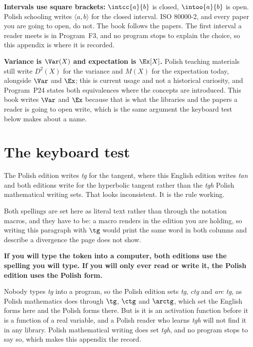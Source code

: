 \begin{notationbox}
\textbf{Intervals use square brackets:} $\intcc{a}{b}$ is closed,
$\intoo{a}{b}$ is open. Polish schooling writes $\langle a, b\rangle$ for the
closed interval. ISO 80000-2, and every paper you are going to open, do not.
The book follows the papers. The first interval a reader meets is in
Program~F3, and no program stops to explain the choice, so this appendix is
where it is recorded.
\end{notationbox}

\begin{notationbox}
\textbf{Variance is $\Var(X)$ and expectation is $\Ex[X]$.} Polish teaching
materials still write $D^{2}(X)$ for the variance and $M(X)$ for the
expectation today, alongside $\Var$ and $\Ex$; this is current usage and not a
historical curiosity, and Program~P24 states both equivalences where the
concepts are introduced. This book writes $\Var$ and $\Ex$ because that is what
the libraries and the papers a reader is going to open write, which is the same
argument the keyboard test below makes about a name.
\end{notationbox}

\section{The keyboard test}
\label{sec:appB-keyboard}

\noindent
The Polish edition writes \emph{tg} for the tangent, where this English
edition writes \emph{tan} \dash{} and both editions write  for the
hyperbolic tangent rather than the \emph{tgh} Polish mathematical writing
sets. That looks inconsistent. It is the rule working.

Both spellings are set here as literal text rather than through the notation
macros, and they have to be: a macro renders in the edition you are holding,
so writing this paragraph with $\tg$ would print the same word in both columns
and describe a divergence the page does not show.

\begin{note}
\textbf{If you will type the token into a computer, both editions use the
spelling you will type. If you will only ever read or write it, the Polish
edition uses the Polish form.}

Nobody types \emph{tg} into a program, so the Polish edition sets \emph{tg},
\emph{ctg} and \emph{arc tg}, as Polish mathematics does \dash{} through
$\tg$, $\ctg$ and $\arctg$, which set the English forms here and the Polish
forms there. But  is
 \dash{} it is an activation function before it is a
function of a real variable, and a Polish reader who learns \emph{tgh} will not
find it in any library. Polish mathematical writing does set \emph{tgh}, and no
program stops to say so, which makes this appendix the record.
\end{note}
